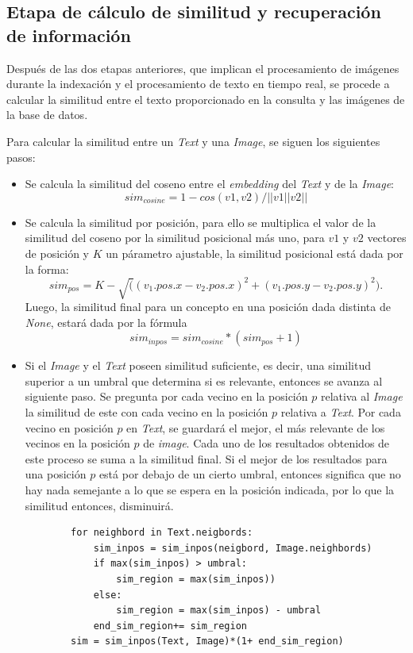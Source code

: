 \subsection{Etapa de cálculo de similitud y recuperación de información}

Después de las dos etapas anteriores, que implican el procesamiento de imágenes durante la indexación y el procesamiento de texto en tiempo real, se procede a calcular la similitud entre el texto proporcionado en la consulta y las imágenes de la base de datos.

Para calcular la similitud entre un \textit{Text} y una \textit{Image}, se siguen los siguientes pasos:
\begin{itemize}

    \item  Se calcula la similitud del coseno entre el \textit{embedding} del \textit{Text} y de la \textit{Image}: 
    \[sim_{cosine} = 1- cos(v1,v2)/||v1||v2||\]

    \item  Se calcula la similitud por posici\'on, para ello se multiplica el valor de la similitud del coseno por la similitud posicional m\'as uno, para $v1$ y $v2$ vectores de posici\'on y $K$ un p\'arametro ajustable, la similitud posicional est\'a dada por la forma: 
        \[sim_{pos} = K- \sqrt((v_1.pos.x - v_2.pos.x)^2+(v_1.pos.y - v_2.pos.y)^2).\]
    Luego, la similitud final para un concepto en una posici\'on dada distinta de \textit{None}, estar\'a dada por la f\'ormula
            \[sim_{inpos} = sim_{cosine} *(sim_{pos}+1)\]
    
    \item Si el \textit{Image} y el \textit{Text} poseen similitud suficiente, es decir, una similitud superior a un umbral que determina si es relevante, entonces se avanza al siguiente paso. Se pregunta por cada vecino en la posici\'on $p$ relativa al \textit{Image} la similitud de este con cada vecino en la posición $p$ relativa a \textit{Text}. Por cada vecino en posici\'on $p$ en \textit{Text}, se guardar\'a el mejor, el m\'as relevante de los vecinos en la posici\'on $p$ de \textit{image}. Cada uno de los resultados obtenidos de este proceso se suma a la similitud final. Si el mejor de los resultados para una posición $p$ está por debajo de un cierto umbral, entonces significa que no hay nada semejante a lo que se espera en la posición indicada, por lo que la similitud entonces, disminuirá.

    \begin{verbatim}
        for neighbord in Text.neigbords:
            sim_inpos = sim_inpos(neigbord, Image.neighbords)
            if max(sim_inpos) > umbral:
                sim_region = max(sim_inpos))
            else:
                sim_region = max(sim_inpos) - umbral
            end_sim_region+= sim_region
        sim = sim_inpos(Text, Image)*(1+ end_sim_region)
    \end{verbatim}
            

\end{itemize}
